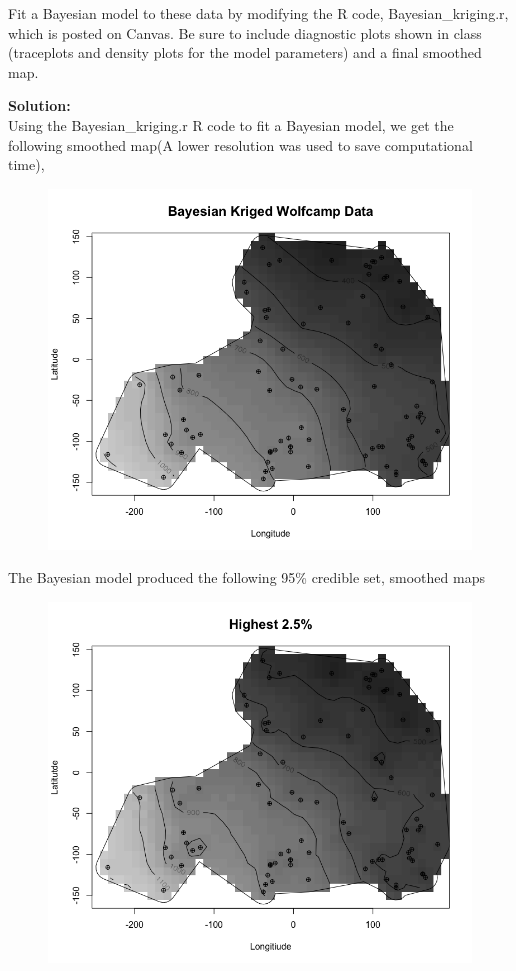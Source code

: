 \documentclass[12pt]{article}
\makeatletter
\theoremstyle{homework}
\newenvironment{exercise}[1]
{\def\@currentlabel{#1}\exercisecore}
{\endexercisecore}
\newcommand{\localhead}[1]{\par\smallskip\noindent\textbf{#1}\nobreak\\}%
\newcommand\solution{\localhead{Solution:}}
\makeatother
\begin{document}
\begin{exercise}{3} Fit a Bayesian model to these data by modifying the R code, Bayesian\_kriging.r, which is posted on Canvas. 
  Be sure to include diagnostic plots shown in class (traceplots and density plots for the model parameters) and a final smoothed map.\\
  \solution Using the Bayesian\_kriging.r R code to fit a Bayesian model, we get the following smoothed map(A lower resolution was used to save computational time),  
  \begin{figure}[H]
    \begin{center}
    \includegraphics[width = \textwidth]{Rplot09.png}
    \end{center}
  \end{figure}
  The Bayesian model produced the following 95\% credible set, smoothed maps
  \begin{figure}[H]
    \begin{center}
    \includegraphics[width = \textwidth]{Rplot10.png}

\end{center}
\end{figure}
\end{exercise}
\end{document}
